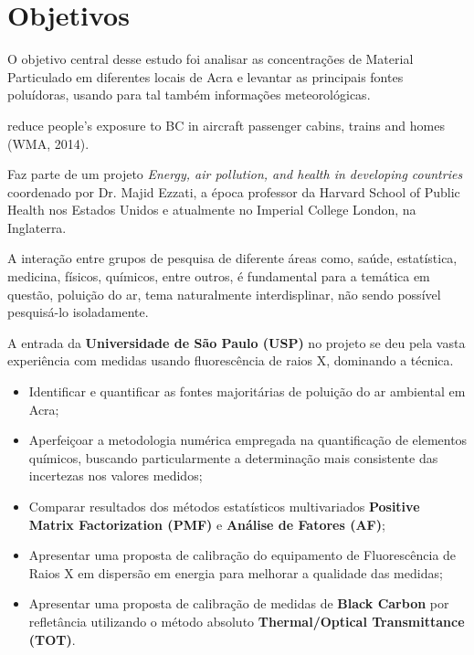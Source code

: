 \section{Objetivos}

O objetivo central desse estudo foi analisar as concentrações de Material 
Particulado em diferentes locais de Acra e levantar as principais fontes 
poluídoras, usando para tal também informações meteorológicas. 

reduce people's exposure to BC in aircraft passenger cabins,
trains and homes (WMA, 2014).

Faz parte de um projeto \textit{Energy, air pollution, and health 
in developing countries} coordenado por Dr. Majid Ezzati, 
a época professor da Harvard School of Public Health nos 
Estados Unidos e atualmente no Imperial College London, 
na Inglaterra.  

A interação entre grupos de pesquisa de diferente áreas como, saúde, 
estatística, medicina, físicos, químicos, entre outros, é fundamental
para a temática em questão, poluição do ar, tema naturalmente  
interdisplinar, não sendo possível pesquisá-lo isoladamente. 

A entrada da \textbf{Universidade de São Paulo (USP)} no projeto se deu pela
vasta experiência com medidas usando fluorescência de raios X, dominando a técnica.

\begin{itemize}
  \item Identificar e quantificar as fontes majoritárias de poluição do ar ambiental em Acra;
  \item Aperfeiçoar a metodologia numérica empregada na quantificação de elementos químicos, 
        buscando particularmente a determinação mais consistente das incertezas nos valores medidos;
  \item Comparar resultados dos métodos estatísticos multivariados
        \textbf{Positive Matrix Factorization (PMF)} e \textbf{Análise de Fatores (AF)};
  \item Apresentar uma proposta de calibração do equipamento de Fluorescência de Raios X
        em dispersão em energia para melhorar a qualidade das medidas;
  \item Apresentar uma proposta de calibração de medidas de \textbf{Black Carbon} por refletância
        utilizando o método absoluto \textbf{Thermal/Optical Transmittance (TOT)}.
\end{itemize}





